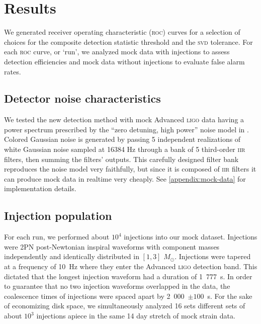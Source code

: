 \section{Results}
\label{SECIV}\label{sec:results}

We generated receiver operating characteristic (\textsc{roc}) curves for a selection of choices for the composite detection statistic threshold and the \textsc{svd} tolerance.  For each \textsc{roc} curve, or `run', we analyzed mock data with injections to assess detection efficiencies and mock data without injections to evaluate false alarm rates.

\subsection{Detector noise characteristics}

We tested the new detection method with mock Advanced \textsc{ligo} data having a power spectrum prescribed by the ``zero detuning, high power'' noise model in \cite{Shoemaker:2009p9770}.  Colored Gaussian noise is generated by passing 5 independent realizations of white Gaussian noise sampled at 16384 Hz through a bank of 5 third-order \textsc{iir} filters, then summing the filters' outputs.  This carefully designed filter bank reproduces the noise model very faithfully, but since it is composed of \textsc{iir} filters it can produce mock data in realtime very cheaply.  See \ref{appendix:mock-data} for implementation details. 

\subsection{Injection population}

For each run, we performed about $10^4$ injections into our mock dataset.  Injections were 2PN post-Newtonian inspiral waveforms with component masses independently and identically distributed in $[1, 3]$ $M_\odot$.  Injections were tapered  at a frequency of 10~Hz where they enter the Advanced \textsc{ligo} detection band.  This dictated that the longest injection waveform had a duration of {\color{red} 1~777~s}.  In order to guarantee that no two injection waveforms overlapped in the data, the coalescence times of injections were spaced apart by {\color{red} 2~000~$\pm 100$~s}.  For the sake of economizing disk space, we simultaneously analyzed {\color{red} 16 sets} different sets of about $10^3$ injections apiece in the same {\color{red} 14 day} stretch of mock strain data.

